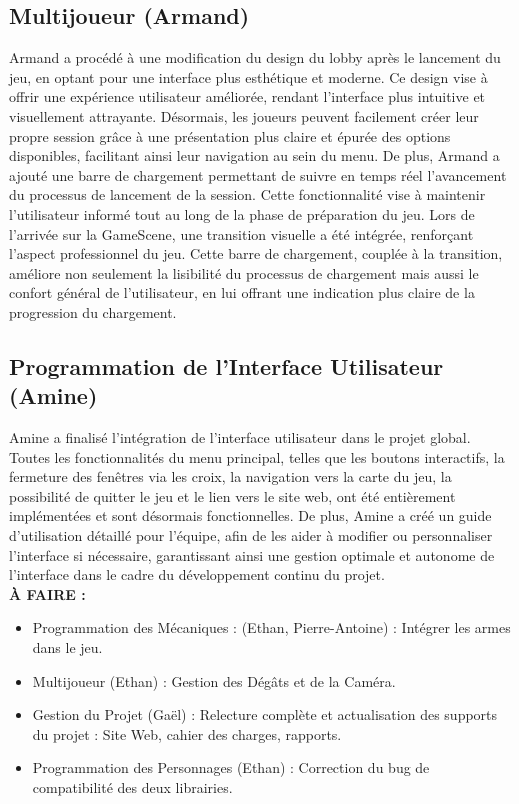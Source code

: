 \documentclass{report}
\begin{document}
\subsection*{Multijoueur (Armand)}
Armand a procédé à une modification du design du lobby après le lancement du jeu, en optant pour une interface plus esthétique et moderne. Ce design vise à offrir une expérience utilisateur améliorée, rendant l’interface plus intuitive et visuellement attrayante. Désormais, les joueurs peuvent facilement créer leur propre session grâce à une présentation plus claire et épurée des options disponibles, facilitant ainsi leur navigation au sein du menu. De plus, Armand a ajouté une barre de chargement permettant de suivre en temps réel l’avancement du processus de lancement de la session. Cette fonctionnalité vise à maintenir l’utilisateur informé tout au long de la phase de préparation du jeu. Lors de l’arrivée sur la GameScene, une transition visuelle a été intégrée, renforçant l’aspect professionnel du jeu. Cette barre de chargement, couplée à la transition, améliore non seulement la lisibilité du processus de chargement mais aussi le confort général de l’utilisateur, en lui offrant une indication plus claire de la progression du chargement.

\subsection*{Programmation de l'Interface Utilisateur (Amine)}
Amine a finalisé l’intégration de l’interface utilisateur dans le projet global. Toutes les fonctionnalités du menu principal, telles que les boutons interactifs, la fermeture des fenêtres via les croix, la navigation vers la carte du jeu, la possibilité de quitter le jeu et le lien vers le site web, ont été entièrement implémentées et sont désormais fonctionnelles. De plus, Amine a créé un guide d’utilisation détaillé pour l’équipe, afin de les aider à modifier ou personnaliser l’interface si nécessaire, garantissant ainsi une gestion optimale et autonome de l’interface dans le cadre du développement continu du projet.
\\[1cm]
\textbf{À FAIRE :}
\begin{itemize}
    \item Programmation des Mécaniques : (Ethan, Pierre-Antoine) : Intégrer les armes dans le jeu.
    \item Multijoueur (Ethan) : Gestion des Dégâts et de la Caméra.
    \item Gestion du Projet (Gaël) : Relecture complète et actualisation des supports du projet : Site Web, cahier des charges, rapports.
    \item Programmation des Personnages (Ethan) :  Correction du bug de compatibilité des deux librairies.
\end{itemize}
\end{document}
